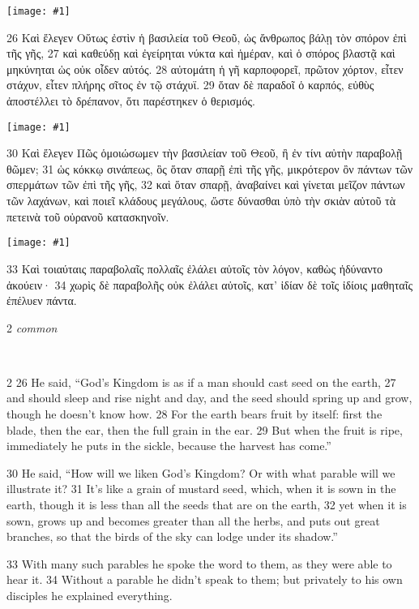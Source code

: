 \documentclass[10pt,a5paper,twoside,twocolumn]{book}
\newcommand{\fig}[1]{\texttt{[image: \#1]}\label{fig:#1}}
\newcommand*\cleartoleftpage{%
  \ifodd\value{page}\hbox{}\clearpage\fi
}
\newcommand{\separator}{
  \vspace{-0.5\baselineskip}%
  \hspace{0.27\textwidth}%
  \noindent\makebox[\linewidth]{\resizebox{0.3333\linewidth}{1pt}{$\bullet$}}\bigskip%
  \vspace{-0.5\baselineskip}
}
\newcommand{\sceneseparator}{%
  \vspace{-0.7\baselineskip}%
  \hspace{-0.01\textwidth}\noindent\makebox[\linewidth]{\resizebox{0.15\linewidth}{1pt}{$\bullet$}}%
  \vspace{-0.2\baselineskip}
}
\newenvironment{facing}{\cleartoleftpage}{\clearpage\pagebreak}
\newenvironment{help}{\clearpage}{}
\newenvironment{helpsec}{\begin{minipage}[t]{\textwidth}\begin{multicols}{2}}{\end{multicols}\end{minipage}}
\newenvironment{vocab}{\begin{helpsec}}{\end{helpsec}}
\newenvironment{translation}{\separator\\\begin{helpsec}\footnotesize}{\end{helpsec}}
\begin{document}
\begin{facing}

\fig{04-26} %

26 Καὶ ἔλεγεν Οὕτως ἐστὶν ἡ βασιλεία τοῦ Θεοῦ, ὡς ἄνθρωπος βάλῃ τὸν σπόρον ἐπὶ τῆς γῆς, 27 καὶ καθεύδῃ καὶ ἐγείρηται νύκτα καὶ ἡμέραν, καὶ ὁ σπόρος βλαστᾷ καὶ μηκύνηται ὡς οὐκ οἶδεν αὐτός. 28 αὐτομάτη ἡ γῆ καρποφορεῖ, πρῶτον χόρτον, εἶτεν στάχυν, εἶτεν πλήρης σῖτος ἐν τῷ στάχυϊ. 29 ὅταν δὲ παραδοῖ ὁ καρπός, εὐθὺς ἀποστέλλει τὸ δρέπανον, ὅτι παρέστηκεν ὁ θερισμός. 

\fig{04-28} %

30 Καὶ ἔλεγεν Πῶς ὁμοιώσωμεν τὴν βασιλείαν τοῦ Θεοῦ, ἢ ἐν τίνι αὐτὴν παραβολῇ θῶμεν; 31 ὡς κόκκῳ σινάπεως, ὃς ὅταν σπαρῇ ἐπὶ τῆς γῆς, μικρότερον ὂν πάντων τῶν σπερμάτων τῶν ἐπὶ τῆς γῆς, 32 καὶ ὅταν σπαρῇ, ἀναβαίνει καὶ γίνεται μεῖζον πάντων τῶν λαχάνων, καὶ ποιεῖ κλάδους μεγάλους, ὥστε δύνασθαι ὑπὸ τὴν σκιὰν αὐτοῦ τὰ πετεινὰ τοῦ οὐρανοῦ κατασκηνοῖν. 

\vfill

\fig{04-30} %

\vfill

\sceneseparator

\vfill

33 Καὶ τοιαύταις παραβολαῖς πολλαῖς ἐλάλει αὐτοῖς τὸν λόγον, καθὼς ἠδύναντο ἀκούειν· 34 χωρὶς δὲ παραβολῆς οὐκ ἐλάλει αὐτοῖς, κατ’ ἰδίαν δὲ τοῖς ἰδίοις μαθηταῖς ἐπέλυεν πάντα.


\begin{help}
\begin{vocab}
\emph{common}\\

\end{vocab}
\begin{translation}
 26 He said, ``God's Kingdom is as if a man should cast seed on the earth, 27  and should sleep and rise night and day, and the seed should spring up and grow, though he doesn't know how. 28  For the earth bears fruit by itself: first the blade, then the ear, then the full grain in the ear. 29  But when the fruit is ripe, immediately he puts in the sickle, because the harvest has come.''

30 He said, ``How will we liken God's Kingdom? Or with what parable will we illustrate it? 31  It's like a grain of mustard seed, which, when it is sown in the earth, though it is less than all the seeds that are on the earth, 32  yet when it is sown, grows up and becomes greater than all the herbs, and puts out great branches, so that the birds of the sky can lodge under its shadow.''

33 With many such parables he spoke the word to them, as they were able to hear it. 34 Without a parable he didn't speak to them; but privately to his own disciples he explained everything. 

\end{translation}
\end{help}
\end{facing}
\end{document}
